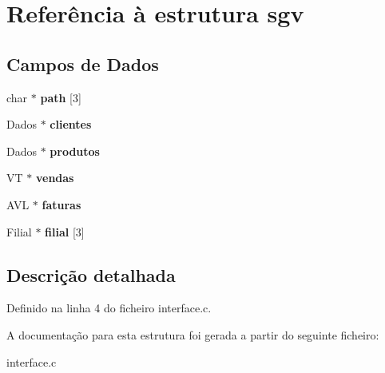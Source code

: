\hypertarget{structsgv}{}\section{Referência à estrutura sgv}
\label{structsgv}
\subsection*{Campos de Dados}
\begin{DoxyCompactItemize}
\item 
\mbox{\label{structsgv_a0ff5041803e6298d34e3ed308f2b9aeb}} 
char $\ast$ {\bfseries path} \mbox{[}3\mbox{]}
\item 
\mbox{\label{structsgv_abe14db8ce7017577d2b181f9c4655f4f}} 
Dados $\ast$ {\bfseries clientes}
\item 
\mbox{\label{structsgv_a3a09e9ce6464adbaf1aca3b89fcc6a75}} 
Dados $\ast$ {\bfseries produtos}
\item 
\mbox{\label{structsgv_aa47aedd9d6ed5f4910b478c3c622633f}} 
VT $\ast$ {\bfseries vendas}
\item 
\mbox{\label{structsgv_a995a8da7e322efdf98992a95034d19e7}} 
A\+VL $\ast$ {\bfseries faturas}
\item 
\mbox{\label{structsgv_a628652f2be4e76e6b8d3d9d12e9c4543}} 
Filial $\ast$ {\bfseries filial} \mbox{[}3\mbox{]}
\end{DoxyCompactItemize}


\subsection{Descrição detalhada}


Definido na linha 4 do ficheiro interface.\+c.



A documentação para esta estrutura foi gerada a partir do seguinte ficheiro\+:\begin{DoxyCompactItemize}
\item 
interface.\+c\end{DoxyCompactItemize}
